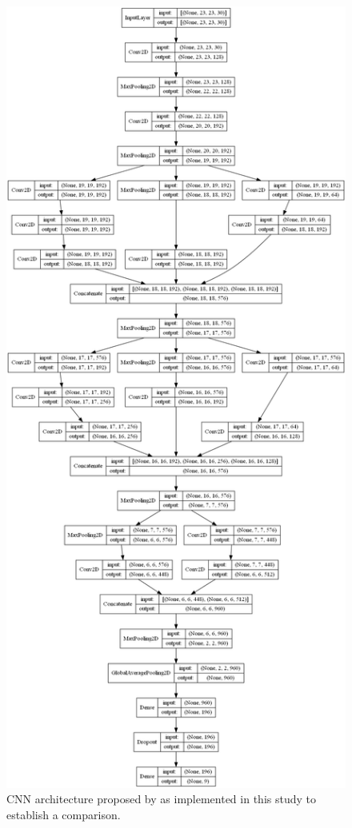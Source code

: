 \begin{figure}[ht]
    \centering
    \includegraphics[width=\linewidth]{figs/vineyard_classification/networks/lt_cnn_23x22_64.png}
	\caption{CNN architecture proposed by \cite{lu_hyperspectral_2022} as implemented in this study to establish a comparison. }
	\label{fig:lt_cnn}
\end{figure}


